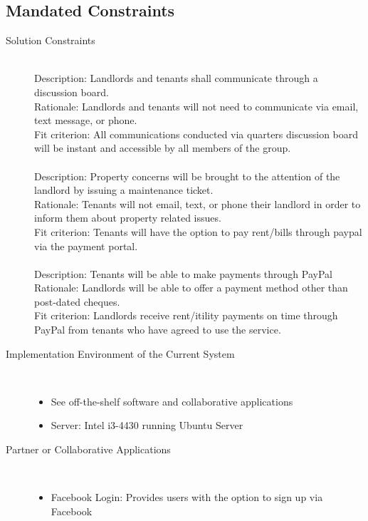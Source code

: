 \documentclass[12pt, titlepage]{article}
\begin{document}
\subsection{Mandated Constraints} %
\begin{description}
  \item[Solution Constraints] \hfill \\
    Description: Landlords and tenants shall communicate through a discussion
    board. \\
    Rationale: Landlords and tenants will not need to communicate via email,
    text message, or phone. \\
    Fit criterion: All communications conducted via quarters discussion
    board will be instant and accessible by all members of the group. \\
    \\
    Description: Property concerns will be brought to the attention of the
    landlord by issuing a maintenance ticket. \\
    Rationale: Tenants will not email, text, or phone their landlord in order
    to inform them about property related issues. \\
    Fit criterion: Tenants will have the option to pay rent/bills through
    paypal via the payment portal. \\
    \\
    Description: Tenants will be able to make payments through PayPal
    Rationale: Landlords will be able to offer a payment method other than
    post-dated cheques. \\
    Fit criterion: Landlords receive rent/itility payments on time through
    PayPal from tenants who have agreed to use the service. \\
  \item[Implementation Environment of the Current System] \hfill \\
    \begin{itemize}
      \item See off-the-shelf software and collaborative applications
      \item Server: Intel i3-4430 running Ubuntu Server
    \end{itemize}
  \item[Partner or Collaborative Applications] \hfil \\
    \begin{itemize}
    \item Facebook Login: Provides users with the option to sign up via Facebook

\end{itemize}
\end{description}
\end{document}
